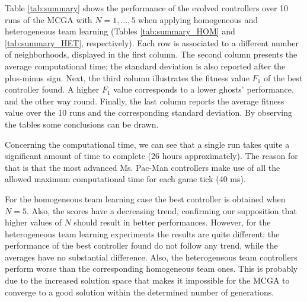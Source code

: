\documentclass[journal]{IEEEtran}
\begin{document}
Table \ref{tab:summary} shows the performance of the evolved controllers over 10 runs of the MCGA with $N=1,\ldots,5$ when applying homogeneous and heterogeneous team learning (Tables \ref{tab:summary_HOM} and \ref{tab:summary_HET}, respectively). Each row is associated to a different number of neighborhoods, displayed in the first column. The second column presents the average computational time; the standard deviation is also reported after the plus-minus sign. Next, the third column illustrates the fitness value $F_1$ of the best controller found. A higher $F_1$ value corresponds to a lower ghosts' performance, and the other way round. Finally, the last column reports the average fitness value over the 10 runs and the corresponding standard deviation. By observing the tables some conclusions can be drawn.

Concerning the computational time, we can see that a single run takes
quite a significant amount of time to complete (26 hours
approximately). The reason for that is that the most advanced
Ms. Pac-Man controllers make use of all the allowed maximum
computational time for each game tick (40 ms). 

For the homogeneous team learning case the best controller is obtained
when $N=5$. Also, the scores have a decreasing trend, confirming our
supposition that higher values of $N$ should result in better
performances. However, for the heterogeneous team learning experiments
the results are quite different: the performance of the best controller found do not follow any trend,
while the averages have no substantial difference. Also, the heterogeneous team controllers
perform worse than the corresponding homogeneous team ones. This is probably due to
the increased solution space that makes it impossible for the MCGA to
converge to a good solution within the determined number of
generations. %
\end{document}

